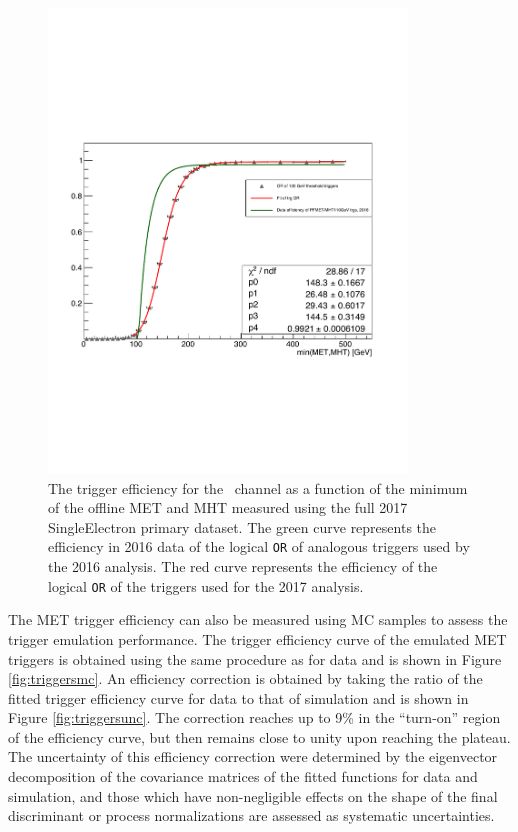 \begin{figure}[htbp]
  \centering
    \includegraphics[width=3.75in]{images/2017METTriggersData}
    \caption[Trigger Efficiency for \ZnnHbb\ in 2017 Data]{The trigger efficiency for the \ZnnHbb\ channel as a function of the minimum of the offline MET and MHT measured using the full 2017 SingleElectron primary dataset. The green curve represents the efficiency in 2016 data of the logical \texttt{OR} of analogous triggers used by the 2016 analysis. The red curve represents the efficiency of the logical \texttt{OR} of the triggers used for the 2017 analysis.}
    \label{fig:triggersdata}
\end{figure}

The MET trigger efficiency can also be measured using MC samples to assess the trigger emulation performance. The trigger efficiency curve of the emulated MET triggers is obtained using the same procedure as for data and is shown in Figure \ref{fig:triggersmc}. An efficiency correction is obtained by taking the ratio of the fitted trigger efficiency curve for data to that of simulation and is shown in Figure \ref{fig:triggersunc}. The correction reaches up to 9\% in the ``turn-on'' region of the efficiency curve, but then remains close to unity upon reaching the plateau. The uncertainty of this efficiency correction were determined by the eigenvector decomposition of the covariance matrices of the fitted functions for data and simulation, and those which have non-negligible effects on the shape of the final discriminant or process normalizations are assessed as systematic uncertainties.

